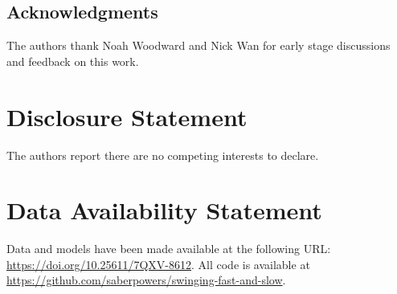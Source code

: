 \documentclass[
  12pt]{article}
\begin{document}
  \subsection*{Acknowledgments}

    The authors thank Noah Woodward and Nick Wan for early stage discussions and feedback on this work.

  \section*{Disclosure Statement}
  
    The authors report there are no competing interests to declare.

  \section*{Data Availability Statement}
  
    Data and models have been made available at the following URL: \url{https://doi.org/10.25611/7QXV-8612}. All code is available at \url{https://github.com/saberpowers/swinging-fast-and-slow}.

  
\end{document}
